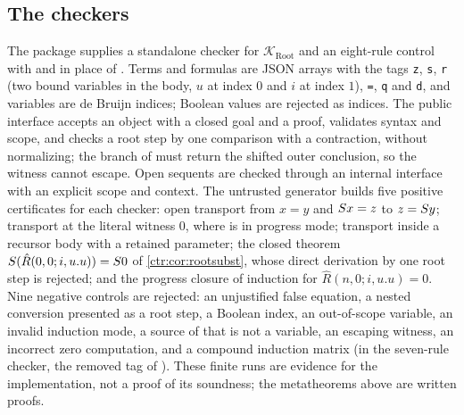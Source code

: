 \subsection{The checkers}\label{ctr:sec:rootcheckers}

The package  supplies a standalone checker for $\mathcal K_{\mathrm{Root}}$ and an
eight-rule control with  and  in place of . Terms and
formulas are JSON arrays with the tags \texttt{z}, \texttt{s}, \texttt{r} (two bound variables
in the body, $u$ at index $0$ and $i$ at index $1$), \texttt{=}, \texttt{q} and \texttt{d}, and
variables are de Bruijn indices; Boolean values are rejected as indices. The public interface
accepts an object with a closed goal and a proof, validates syntax and scope, and checks a
root step by one comparison with a contraction, without normalizing; the branch of
 must return the shifted outer conclusion, so the witness cannot escape. Open
sequents are checked through an internal interface with an explicit scope and context. The
untrusted generator builds five positive certificates for each checker: open transport from
$x=y$ and $S x=z$ to $z=S y$; transport at the literal witness $0$, where 
is in progress mode; transport inside a recursor body with a retained parameter; the closed
theorem $S(\hat R(0,0;i,u.u))=S 0$ of \cref{ctr:cor:rootsubst}, whose direct
derivation by one root step is rejected; and the progress closure of induction for
$\hat R(n,0;i,u.u)=0$. Nine negative controls are rejected: an unjustified false equation, a
nested conversion presented as a root step, a Boolean index, an out-of-scope variable, an
invalid induction mode, a source of  that is not a variable, an escaping
witness, an incorrect zero computation, and a compound induction matrix (in the seven-rule
checker, the removed tag of ). These finite runs are evidence for the
implementation, not a proof of its soundness; the metatheorems above are written proofs.

